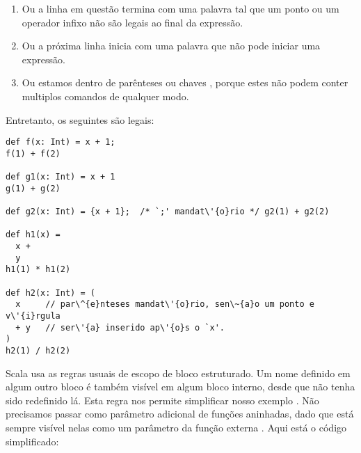 \begin{enumerate}
\item 
Ou a linha em quest\~{a}o termina com uma palavra tal que um ponto ou um 
operador infixo n\~{a}o s\~{a}o legais ao final da express\~{a}o.
\item 
Ou a pr\'{o}xima linha inicia com uma palavra que n\~{a}o pode iniciar uma express\~{a}o.
\item
Ou estamos dentro de par\^{e}nteses  ou chaves \prog{}, porque 
estes n\~{a}o podem conter multiplos comandos de qualquer modo.
\end{enumerate}

Entretanto, os seguintes s\~{a}o legais:

\begin{lstlisting}
def f(x: Int) = x + 1;
f(1) + f(2)

def g1(x: Int) = x + 1
g(1) + g(2)

def g2(x: Int) = {x + 1};  /* `;' mandat\'{o}rio */ g2(1) + g2(2)

def h1(x) = 
  x + 
  y
h1(1) * h1(2)

def h2(x: Int) = (
  x     // par\^{e}nteses mandat\'{o}rio, sen\~{a}o um ponto e v\'{i}rgula
  + y   // ser\'{a} inserido ap\'{o}s o `x'.
)
h2(1) / h2(2)
\end{lstlisting}

Scala usa as regras usuais de escopo de bloco estruturado. Um nome definido em
algum outro bloco \'{e} tamb\'{e}m vis\'{i}vel em algum bloco interno, desde que n\~{a}o tenha
sido redefinido l\'{a}. Esta regra nos permite simplificar nosso exemplo .
N\~{a}o precisamos passar  como par\^{a}metro adicional de fun\c{c}\~{o}es aninhadas, dado
que est\'{a} sempre vis\'{i}vel nelas como um par\^{a}metro da fun\c{c}\~{a}o externa .
Aqui est\'{a} o c\'{o}digo simplificado:
   
